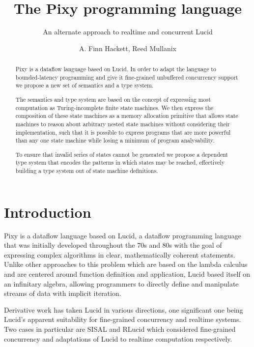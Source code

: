 \documentclass{scrartcl}
\begin{document}
    \title{The Pixy programming language}
    \subtitle{An alternate approach to realtime and concurrent Lucid}
    \author{A. Finn Hackett, Reed Mullanix}
    
    \maketitle
    
    \begin{abstract}
        Pixy is a dataflow language based on Lucid\cite{wadgeashcroft85}. In order to adapt the language to bounded-latency programming and give it fine-grained unbuffered concurrency support we propose a new set of semantics and a type system.
        
        The semantics and type system are based on the concept of expressing most computation as Turing-incomplete finite state machines. We then express the composition of these state machines as a memory allocation primitive that allows state machines to reason about arbitrary nested state machines without considering their implementation, such that it is possible to express programs that are more powerful than any one state machine while losing a minimum of program analysability.
        
        To ensure that invalid series of states cannot be generated we propose a dependent type system that encodes the patterns in which states may be reached, effectively building a type system out of state machine definitions.
    \end{abstract}

    \tableofcontents

    \section{Introduction}

    Pixy is a dataflow language based on Lucid\cite{wadgeashcroft85}, a dataflow programming language that was initially developed throughout the 70s and 80s with the goal of expressing complex algorithms in clear, mathematically coherent statements. Unlike other approaches to this problem which are based on the lambda calculus and are centered around function definition and application, Lucid based itself on an infinitary algebra, allowing programmers to directly define and manipulate streams of data with implicit iteration.

    Derivative work has taken Lucid in various directions, one significant one being Lucid's apparent suitability for fine-grained concurrency and realtime systems. Two cases in particular are SISAL and RLucid\cite{plaice05} which considered fine-grained concurrency and adaptations of Lucid to realtime computation respectively.
    
\end{document}
